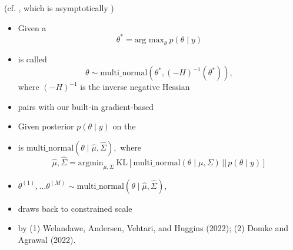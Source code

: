 \documentclass[9pt]{report}
\newcommand{\draw}[2]{#1^{(#2)}}
\begin{document}
\sld{}
\vfill 
\begin{center}
  {\Huge {}}
\end{center}
\vfill 
\vfill 
\begin{center}
{\Large  (cf. , which is asymptotically )}
\end{center}

\begin{itemize}
\item Given a 
  $$\theta^* = \textrm{arg max}_\theta \ p(\theta \mid y)$$
\item {} is called 
  $$\theta \sim \textrm{multi\_normal}(\theta^*, (-H)^{-1}(\theta^*)),$$
  where $(-H)^{-1}$ is the inverse negative Hessian
\item pairs with our built-in gradient-based 
  \vfill
\end{itemize}

\begin{itemize}
\item Given posterior $p(\theta \mid y)$ on the
\item {} is $\textrm{multi\_normal}\!\left(\theta \mid
  \widehat{\mu}, \widehat{\Sigma}\right),$ where
    $$
  \widehat{\mu}, \widehat{\Sigma}
  = \textrm{argmin}_{\mu, \Sigma}
  \ \textrm{KL}\!\left[\textrm{multi\_normal}(\theta \mid \mu, \Sigma) 
    \,\big|\big|\, p(\theta \mid y) \right]
  $$
\item {} $\draw{\theta}{1}, \ldots \draw{\theta}{M} \sim \textrm{multi\_normal}\!\left(\theta \mid
    \widehat{\mu}, \widehat{\Sigma}\right),$
\item {} draws back to constrained scale
\item {} by (1) Welandawe, Andersen, Vehtari, and 
  Huggins (2022); (2) Domke and Agrawal (2022).
\end{itemize}
\end{document}
